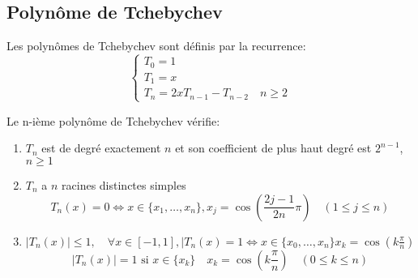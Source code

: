 \documentclass[a4paper]{report}
\begin{document}
\subsection{Polynôme de Tchebychev}
\begin{definition}
    Les polynômes de Tchebychev sont définis par la recurrence:
    \[
    \begin{cases}
        T_0 = 1\\
        T_1 = x\\
        T_n = 2xT_{n-1} - T_{n-2} \quad n\ge 2
    \end{cases}
    \] 
\end{definition}
\begin{prop}
   Le n-ième polynôme de Tchebychev vérifie:
   \begin{enumerate}
       \item $T_n$ est de degré exactement  $n$ et son coefficient de plus haut degré est  $2^{n-1}$,  $n \ge 1$
       \item $T_n$ a  $n$ racines distinctes simples
            \[
                T_n(x) = 0 \iff x \in \{x_1, \ldots, x_n\}, x_j = \cos( \frac{2j - 1}{2n} \pi)  \quad (1 \le j \le  n)
           \] 
       \item $|T_n(x)| \le 1, \quad \forall x \in [-1, 1], |T_n(x) = 1 \iff x \in \{x_0, \ldots, x_n\} x_k = \cos(k\frac{\pi}{n})$
           \[
               |T_n(x)| = 1 \text{ si } x \in \{x_k\} \quad x_k = \cos(k\frac{\pi}{n}) \quad (0 \le k \le n)
           \] 
   \end{enumerate}
\end{prop}
\end{document}
